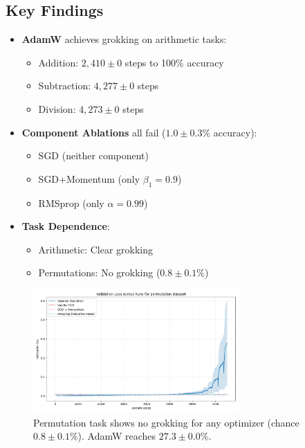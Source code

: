 \documentclass{article} %
\begin{document}
\subsection{Key Findings}
\begin{itemize}
    \item \textbf{AdamW} achieves grokking on arithmetic tasks:
    \begin{itemize}
        \item Addition: $2,\!410\pm0$ steps to 100\% accuracy
        \item Subtraction: $4,\!277\pm0$ steps
        \item Division: $4,\!273\pm0$ steps
    \end{itemize}
    \item \textbf{Component Ablations} all fail ($1.0\pm0.3\%$ accuracy):
    \begin{itemize}
        \item SGD (neither component)
        \item SGD+Momentum (only $\beta_1=0.9$)
        \item RMSprop (only $\alpha=0.99$)
    \end{itemize}
    \item \textbf{Task Dependence}:
    \begin{itemize}
        \item Arithmetic: Clear grokking
        \item Permutations: No grokking ($0.8\pm0.1\%$)
    \end{itemize}
\end{itemize}

\begin{figure}[t]
    \centering
    \includegraphics[width=0.7\textwidth]{val_acc_permutation.png}
    \caption{Permutation task shows no grokking for any optimizer (chance $0.8\pm0.1\%$). AdamW reaches $27.3\pm0.0\%$.}
    \label{fig:perm_acc}
\end{figure}
\end{document}
